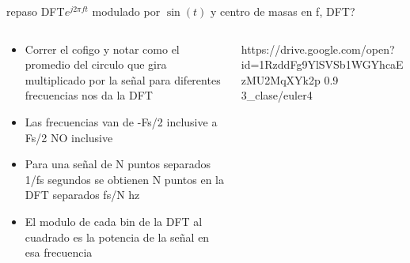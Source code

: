\begin{frame}{repaso DFT}{$e^{j2\pi ft}$ modulado por $\sin(t)$ y centro de masas en f, DFT?}
   \handsonicon
   \footnotesize
   \begin{columns}[c]
      \hspace{2pt}
      \begin{column}{.4\textwidth}
         \begin{itemize}
            \item{Correr el cofigo y notar como el promedio del circulo que gira multiplicado por la señal para diferentes frecuencias nos da la DFT}
            \item{Las frecuencias van de -Fs/2 inclusive a Fs/2 NO inclusive}
            \item{Para una señal de N puntos separados 1/fs segundos se obtienen N puntos en la DFT separados fs/N hz}
            \item{El modulo de cada bin de la DFT al cuadrado es la potencia de la señal en esa frecuencia}
         \end{itemize}
      \end{column}
      \hspace{2pt}
      \vrule
      \hspace{2pt}
      \begin{column}{.6\textwidth}
         {https://drive.google.com/open?id=1RzddFg9YlSVSb1WGYhcaEzMU2MqXYk2p}
         {0.9}
         {3_clase/euler4}
      \end{column}
      \hspace{2pt}
   \end{columns}
   \vfill
\end{frame}
